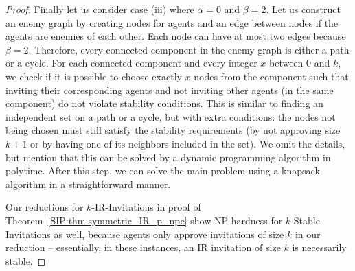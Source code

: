 \begin{proof}
	Finally let us consider case (iii) where $\alpha = 0$ and $\beta = 2$.
	Let us construct an enemy graph by creating nodes for agents and an edge between nodes if the agents are enemies of each other. Each node can have at most two edges because $\beta = 2$.
	Therefore, every connected component in the enemy graph is either a path or a cycle.
	For each connected component and every integer $x$ between $0$ and $k$, we check if it is possible to choose exactly $x$ nodes from the component such that inviting their corresponding agents and not inviting other agents (in the same component) do not violate stability conditions. This is similar to finding an independent set on a path or a cycle, but with extra conditions: the nodes not being chosen must still satisfy the stability requirements (by not approving size $k+1$ or by having one of its neighbors included in the set). We omit the details, but mention that this can be solved by a dynamic programming algorithm in polytime. After this step, we can solve the main problem using a knapsack algorithm in a straightforward manner. 
	
	Our reductions for $k$-IR-Invitations in proof of Theorem~\ref{SIP:thm:symmetric_IR_p_npc} show NP-hardness for $k$-Stable-Invitations as well, because agents only approve invitations of size $k$ in our reduction -- essentially, in these instances, an IR invitation of size $k$ is necessarily stable.
\end{proof}



